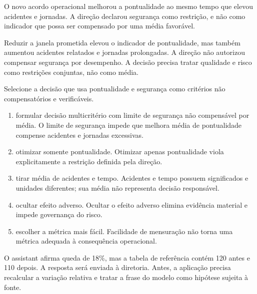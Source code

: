 
\TextoBase

O novo acordo operacional melhorou a pontualidade ao mesmo tempo que elevou acidentes e jornadas. A direção declarou segurança como restrição, e não como indicador que possa ser compensado por uma média favorável.


Reduzir a janela prometida elevou o indicador de pontualidade, mas também aumentou acidentes relatados e jornadas prolongadas. A direção não autorizou compensar segurança por desempenho. A decisão precisa tratar qualidade e risco como restrições conjuntas, não como média.

\FonteDidatica

\Comando Selecione a decisão que usa pontualidade e segurança como critérios não compensatórios e verificáveis.

\begin{enumerate}[label=\Alph*)]
  \item formular decisão multicritério com limite de segurança não compensável por média. O limite de segurança impede que melhora média de pontualidade compense acidentes e jornadas excessivas.
  \item otimizar somente pontualidade. Otimizar apenas pontualidade viola explicitamente a restrição definida pela direção.
  \item tirar média de acidentes e tempo. Acidentes e tempo possuem significados e unidades diferentes; sua média não representa decisão responsável.
  \item ocultar efeito adverso. Ocultar o efeito adverso elimina evidência material e impede governança do risco.
  \item escolher a métrica mais fácil. Facilidade de mensuração não torna uma métrica adequada à consequência operacional.
\end{enumerate}


\TextoBase

O assistant afirma queda de 18\%, mas a tabela de referência contém 120 antes e 110 depois. A resposta será enviada à diretoria. Antes, a aplicação precisa recalcular a variação relativa e tratar a frase do modelo como hipótese sujeita à fonte.

